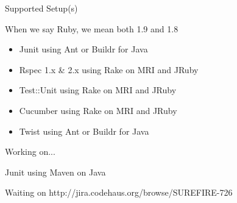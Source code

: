 \documentclass{beamer}
\begin{document}
\begin{frame}{Supported Setup(s)}
  \begin{centering}
    When we say Ruby, we mean both 1.9 and 1.8
    \quad\\
    \begin{itemize}
      \item {\color{green}Junit} using {\color{red}Ant} or {\color{red}Buildr} for {\color{blue}Java}
        \pause
      \item {\color{green}Rspec 1.x \& 2.x} using {\color{red}Rake} on {\color{blue}MRI} and {\color{blue}JRuby}
        \pause
      \item {\color{green}Test::Unit} using {\color{red}Rake} on {\color{blue}MRI} and {\color{blue}JRuby}
        \pause
      \item {\color{green}Cucumber} using {\color{red}Rake} on {\color{blue}MRI} and {\color{blue}JRuby}
        \pause
      \item {\color{green}Twist} using {\color{red}Ant} or {\color{red}Buildr} for {\color{blue}Java}
    \end{itemize}
  \end{centering}
\end{frame}

\begin{frame}{Working on...}
  \begin{centering}
    {\color{green}Junit} using {\color{red}Maven} on {\color{blue}Java}
    \quad\\
    \begin{centering}
      Waiting on http://jira.codehaus.org/browse/SUREFIRE-726
    \end{centering}
  \end{centering}
\end{frame}
\end{document}
